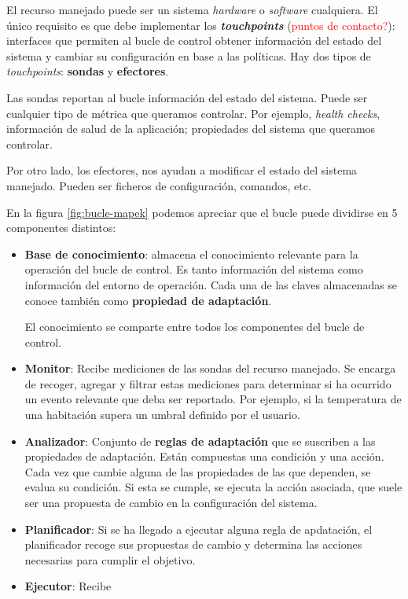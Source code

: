 

El recurso manejado puede ser un sistema \textit{hardware} o \textit{software} cualquiera. El único requisito es que debe implementar los \textbf{\textit{touchpoints}} (\textcolor{red}{puntos de contacto?}): interfaces que permiten al bucle de control obtener información del estado del sistema y cambiar su configuración en base a las políticas. Hay dos tipos de \textit{touchpoints}: \textbf{sondas} y \textbf{efectores}.

Las sondas reportan al bucle información del estado del sistema. Puede ser cualquier tipo de métrica que queramos controlar. Por ejemplo, \textit{health checks}, información de salud de la aplicación; propiedades del sistema que queramos controlar.

Por otro lado, los efectores, nos ayudan a modificar el estado del sistema manejado. Pueden ser ficheros de configuración, comandos, etc.

En la figura \ref{fig:bucle-mapek} podemos apreciar que el bucle puede dividirse en 5 componentes distintos: \cite{ArchitecturalBlueprintAutonomic2006}

\begin{itemize}
  \item \textbf{Base de conocimiento}: almacena el conocimiento relevante para la operación del bucle de control. Es tanto información del sistema como información del entorno de operación. Cada una de las claves almacenadas se conoce también como \textbf{propiedad de adaptación}.

  El conocimiento se comparte entre todos los componentes del bucle de control.

  \item \textbf{Monitor}: Recibe mediciones de las sondas del recurso manejado. Se encarga de recoger, agregar y filtrar estas mediciones para determinar si ha ocurrido un evento relevante que deba ser reportado. Por ejemplo, si la temperatura de una habitación supera un umbral definido por el usuario.

  \item \textbf{Analizador}: Conjunto de \textbf{reglas de adaptación} que se suscriben a las propiedades de adaptación. Están compuestas una condición y una acción. Cada vez que cambie alguna de las propiedades de las que dependen, se evalua su condición. Si esta se cumple, se ejecuta la acción asociada, que suele ser una propuesta de cambio en la configuración del sistema.

  \item \textbf{Planificador}: Si se ha llegado a ejecutar alguna regla de apdatación, el planificador recoge sus propuestas de cambio y determina las acciones necesarias para cumplir el objetivo.

  \item \textbf{Ejecutor}: Recibe
\end{itemize}

